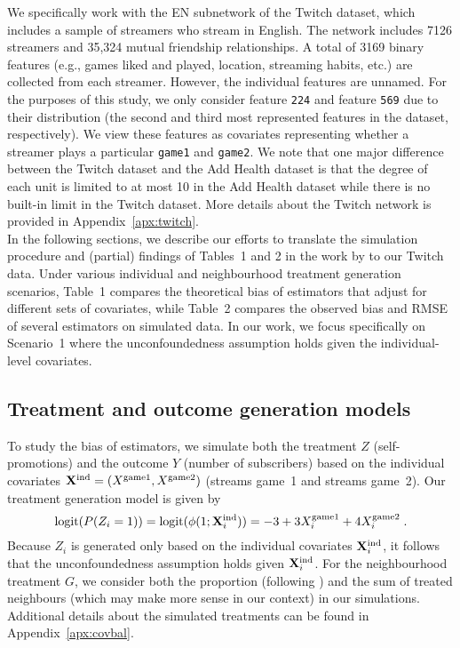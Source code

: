 \documentclass[10pt]{article}
\begin{document}
We specifically work with the EN subnetwork of the Twitch dataset, which includes a sample of streamers who stream in English. The network includes 7126 streamers and 35,324 mutual friendship relationships. A total of 3169 binary features (e.g., games liked and played, location, streaming habits, etc.) are collected from each streamer. However, the individual features are unnamed. For the purposes of this study, we only consider feature \verb|224| and feature \verb|569| due to their distribution (the second and third most represented features in the dataset, respectively). We view these features as covariates representing whether a streamer plays a particular \verb|game1| and \verb|game2|. We note that one major difference between the Twitch dataset and the Add Health dataset is that the degree of each unit is limited to at most 10 in the Add Health dataset while there is no built-in limit in the Twitch dataset. More details about the Twitch network is provided in Appendix~\ref{apx:twitch}.
\\

In the following sections, we describe our efforts to translate the simulation procedure and (partial) findings of Tables~1 and 2 in the work by \textcite{Forastiere:2021} to our Twitch data. Under various individual and neighbourhood treatment generation scenarios, Table~1 compares the theoretical bias of estimators that adjust for different sets of covariates, while Table~2 compares the observed bias and RMSE of several estimators on simulated data. In our work, we focus specifically on Scenario~1 where the unconfoundedness assumption holds given the individual-level covariates.

\subsection{Treatment and outcome generation models} \label{sec:models}

To study the bias of estimators, we simulate both the treatment $Z$ (self-promotions) and the outcome $Y$ (number of subscribers) based on the individual covariates $\mathbf{X}^{\text{ind}}=(X^\text{game1},X^\text{game2})$ (streams game~1 and streams game~2). Our treatment generation model is given by
\[
\text{logit}(P(Z_i=1)) = \text{logit}(\phi(1;\mathbf{X}^{\text{ind}}_i)) = -3 + 3X_i^\text{game1} + 4X_i^\text{game2} \;.
\]
Because $Z_i$ is generated only based on the individual covariates $\mathbf{X}^{\text{ind}}_i$, it follows that the unconfoundedness assumption holds given $\mathbf{X}^{\text{ind}}_i$. For the neighbourhood treatment $G$, we consider both the proportion (following \citeauthor{Forastiere:2021}) and the sum of treated neighbours (which may make more sense in our context) in our simulations. Additional details about the simulated treatments can be found in Appendix~\ref{apx:covbal}.
\\
\end{document}
